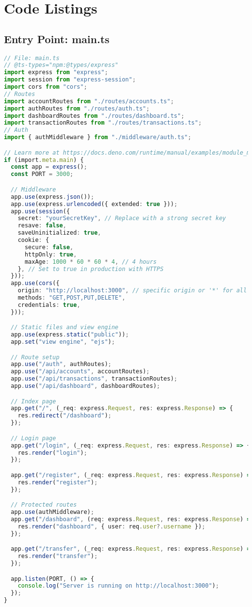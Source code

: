 \section{Code Listings}

\subsection{Entry Point: main.ts}
\begin{lstlisting}[language=TypeScript]
// File: main.ts
// @ts-types="npm:@types/express"
import express from "express";
import session from "express-session";
import cors from "cors";
// Routes
import accountRoutes from "./routes/accounts.ts";
import authRoutes from "./routes/auth.ts";
import dashboardRoutes from "./routes/dashboard.ts";
import transactionRoutes from "./routes/transactions.ts";
// Auth
import { authMiddleware } from "./middleware/auth.ts";

// Learn more at https://docs.deno.com/runtime/manual/examples/module_metadata#concepts
if (import.meta.main) {
  const app = express();
  const PORT = 3000;

  // Middleware
  app.use(express.json());
  app.use(express.urlencoded({ extended: true }));
  app.use(session({
    secret: "yourSecretKey", // Replace with a strong secret key
    resave: false,
    saveUninitialized: true,
    cookie: {
      secure: false,
      httpOnly: true,
      maxAge: 1000 * 60 * 60 * 4, // 4 hours
    }, // Set to true in production with HTTPS
  }));
  app.use(cors({
    origin: "http://localhost:3000", // specific origin or '*' for all
    methods: "GET,POST,PUT,DELETE",
    credentials: true,
  }));

  // Static files and view engine
  app.use(express.static("public"));
  app.set("view engine", "ejs");

  // Route setup
  app.use("/auth", authRoutes);
  app.use("/api/accounts", accountRoutes);
  app.use("/api/transactions", transactionRoutes);
  app.use("/api/dashboard", dashboardRoutes);

  // Index page
  app.get("/", (_req: express.Request, res: express.Response) => {
    res.redirect("/dashboard");
  });

  // Login page
  app.get("/login", (_req: express.Request, res: express.Response) => {
    res.render("login");
  });

  app.get("/register", (_req: express.Request, res: express.Response) => {
    res.render("register");
  });

  // Protected routes
  app.use(authMiddleware);
  app.get("/dashboard", (req: express.Request, res: express.Response) => {
    res.render("dashboard", { user: req.user?.username });
  });

  app.get("/transfer", (_req: express.Request, res: express.Response) => {
    res.render("transfer");
  });

  app.listen(PORT, () => {
    console.log("Server is running on http://localhost:3000");
  });
}
\end{lstlisting}

